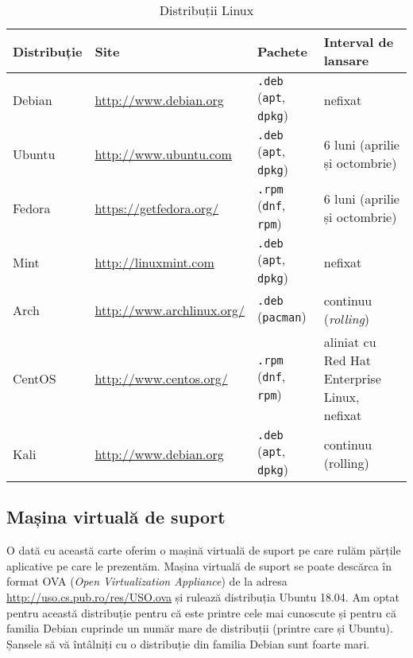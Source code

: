 \begin{table}[!htb]
  \begin{center}
    \begin{tabular}{ p{} p{} p{} p{} }
      \toprule
        \textbf{Distribuție} &
        \textbf{Site} &
        \textbf{Pachete} &
        \textbf{Interval de lansare} \\
      \midrule
        Debian &
        \url{http://www.debian.org} &
        \texttt{.deb} (\texttt{apt}, \texttt{dpkg}) &
        nefixat \\
      \midrule
        Ubuntu &
        \url{http://www.ubuntu.com} &
        \texttt{.deb} (\texttt{apt}, \texttt{dpkg}) &
        6 luni (aprilie și octombrie) \\
      \midrule
        Fedora &
        \url{https://getfedora.org/} &
        \texttt{.rpm} (\texttt{dnf}, \texttt{rpm}) &
        6 luni (aprilie și octombrie) \\
      \midrule
        Mint &
        \url{http://linuxmint.com} &
        \texttt{.deb} (\texttt{apt}, \texttt{dpkg}) &
        nefixat \\
      \midrule
        Arch &
        \url{http://www.archlinux.org/} &
        \texttt{.deb} (\texttt{pacman}) &
        continuu (\textit{rolling}) \\
      \midrule
        CentOS &
        \url{http://www.centos.org/} &
        \texttt{.rpm} (\texttt{dnf}, \texttt{rpm}) &
        aliniat cu Red Hat Enterprise Linux, nefixat \\
      \midrule
        Kali &
        \url{http://www.debian.org} &
        \texttt{.deb} (\texttt{apt}, \texttt{dpkg}) &
        continuu (rolling) \\
      \bottomrule
    \end{tabular}
  \end{center}
  \caption{Distribuții Linux}
  \label{tab:intro:distro}
\end{table}

\subsection{Mașina virtuală de suport}
\label{sec:intro:vm}

O dată cu această carte oferim o mașină virtuală de suport pe care rulăm părțile aplicative pe care le prezentăm. Mașina virtuală de suport se poate descărca în format OVA  (\textit{Open Virtualization Appliance}) de la adresa \url{http://uso.cs.pub.ro/res/USO.ova} și rulează distribuția Ubuntu 18.04. Am optat pentru această distribuție pentru că este printre cele mai cunoscute și pentru că familia Debian cuprinde un număr mare de distribuții (printre care și Ubuntu). Șansele să vă întâlniți cu o distribuție din familia Debian sunt foarte mari.

